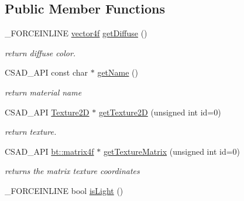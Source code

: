 \subsection*{Public Member Functions}
\begin{DoxyCompactItemize}
\item 
\hypertarget{classcsad_1_1_material_a267a8e919aa3f869b4d4277707a57f94}{\-\_\-\-F\-O\-R\-C\-E\-I\-N\-L\-I\-N\-E \hyperlink{classbt_1_1vector4f}{vector4f} \hyperlink{classcsad_1_1_material_a267a8e919aa3f869b4d4277707a57f94}{get\-Diffuse} ()}\label{classcsad_1_1_material_a267a8e919aa3f869b4d4277707a57f94}

\begin{DoxyCompactList}\small\item\em return diffuse color. \end{DoxyCompactList}\item 
\hypertarget{classcsad_1_1_material_a0cb5cb5f3ace5c2faf5db9ffdffb3f0c}{C\-S\-A\-D\-\_\-\-A\-P\-I const char $\ast$ \hyperlink{classcsad_1_1_material_a0cb5cb5f3ace5c2faf5db9ffdffb3f0c}{get\-Name} ()}\label{classcsad_1_1_material_a0cb5cb5f3ace5c2faf5db9ffdffb3f0c}

\begin{DoxyCompactList}\small\item\em return material name \end{DoxyCompactList}\item 
\hypertarget{classcsad_1_1_material_a192f44e50f85ed9c80b5e507188b4ab9}{C\-S\-A\-D\-\_\-\-A\-P\-I \hyperlink{classcsad_1_1_texture2_d}{Texture2\-D} $\ast$ \hyperlink{classcsad_1_1_material_a192f44e50f85ed9c80b5e507188b4ab9}{get\-Texture2\-D} (unsigned int id=0)}\label{classcsad_1_1_material_a192f44e50f85ed9c80b5e507188b4ab9}

\begin{DoxyCompactList}\small\item\em return texture. \end{DoxyCompactList}\item 
\hypertarget{classcsad_1_1_material_a09fd6a6298ddd9eeb930eb270c3ea58f}{C\-S\-A\-D\-\_\-\-A\-P\-I \hyperlink{classbt_1_1matrix4f}{bt\-::matrix4f} $\ast$ \hyperlink{classcsad_1_1_material_a09fd6a6298ddd9eeb930eb270c3ea58f}{get\-Texture\-Matrix} (unsigned int id=0)}\label{classcsad_1_1_material_a09fd6a6298ddd9eeb930eb270c3ea58f}

\begin{DoxyCompactList}\small\item\em returns the matrix texture coordinates \end{DoxyCompactList}\item 
\hypertarget{classcsad_1_1_material_a7b73ef9d1d2b1fb28249a8067d4976db}{\-\_\-\-F\-O\-R\-C\-E\-I\-N\-L\-I\-N\-E bool \hyperlink{classcsad_1_1_material_a7b73ef9d1d2b1fb28249a8067d4976db}{is\-Light} ()}\label{classcsad_1_1_material_a7b73ef9d1d2b1fb28249a8067d4976db}


\end{DoxyCompactItemize}
